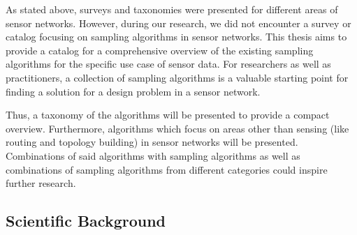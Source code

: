 As stated above, surveys and taxonomies were presented for different areas of
sensor networks. However, during our research, we did not encounter a survey or
catalog focusing on sampling algorithms in sensor networks. This thesis aims to
provide a catalog for a comprehensive overview of the existing sampling
algorithms for the specific use case of sensor data. For researchers as well as
practitioners, a collection of sampling algorithms is a valuable starting point
for finding a solution for a design problem in a sensor network. 
\par
Thus, a taxonomy of the algorithms will be presented to provide a compact
overview. Furthermore, algorithms which focus on areas other than sensing (like
routing and topology building) in sensor networks will be presented.
Combinations of said algorithms with sampling algorithms as well as
combinations of sampling algorithms from different categories could inspire
further research.


\subsection{Scientific Background}
\label{sec:Scientific Background}

